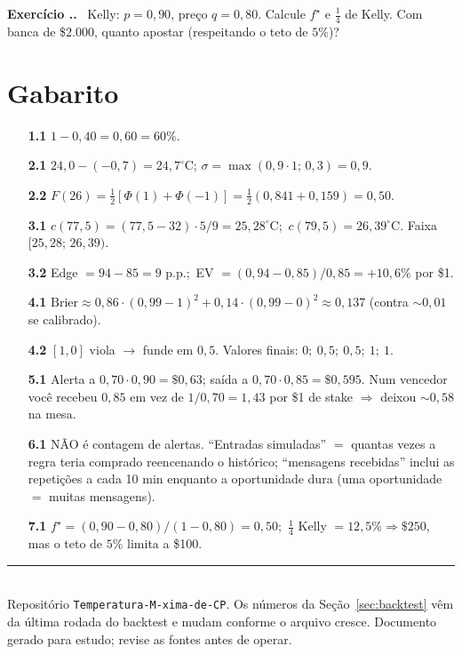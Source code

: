 \documentclass[11pt,a4paper]{article}
\newcounter{exc}[section]
\renewcommand{\theexc}{\thesection.\arabic{exc}}
\newenvironment{exercicio}{\refstepcounter{exc}\medskip\noindent
  \textbf{\color{azul}Exercício \theexc.}\ }{\medskip}
\begin{document}
\begin{exercicio}
Kelly: $p=0{,}90$, preço $q=0{,}80$. Calcule $f^\star$ e $\tfrac14$ de Kelly.
Com banca de \$2.000, quanto apostar (respeitando o teto de $5\%$)?
\end{exercicio}

\appendix
\section{Gabarito}
\begin{enumerate}
  \item[\textbf{1.1}] $1-0{,}40=0{,}60=60\%$.
  \item[\textbf{2.1}] $24{,}0-(-0{,}7)=24{,}7^\circ$C; $\sigma=\max(0{,}9\cdot1;\,0{,}3)=0{,}9$.
  \item[\textbf{2.2}] $F(26)=\tfrac12[\Phi(1)+\Phi(-1)]=\tfrac12(0{,}841+0{,}159)=0{,}50$.
  \item[\textbf{3.1}] $c(77{,}5)=(77{,}5-32)\cdot5/9=25{,}28^\circ$C;\ $c(79{,}5)=26{,}39^\circ$C. Faixa $[25{,}28;\,26{,}39)$.
  \item[\textbf{3.2}] Edge $=94-85=9$ p.p.;\ EV $=(0{,}94-0{,}85)/0{,}85=+10{,}6\%$ por \$1.
  \item[\textbf{4.1}] $\text{Brier}\approx 0{,}86\cdot(0{,}99-1)^2 + 0{,}14\cdot(0{,}99-0)^2 \approx 0{,}137$ (contra $\sim0{,}01$ se calibrado).
  \item[\textbf{4.2}] $[1,0]$ viola $\to$ funde em $0{,}5$. Valores finais: $0;\ 0{,}5;\ 0{,}5;\ 1;\ 1$.
  \item[\textbf{5.1}] Alerta a $0{,}70\cdot0{,}90=\$0{,}63$; saída a $0{,}70\cdot0{,}85=\$0{,}595$. Num vencedor você recebeu $0{,}85$ em vez de $1/0{,}70=1{,}43$ por \$1 de stake $\Rightarrow$ deixou $\sim0{,}58$ na mesa.
  \item[\textbf{6.1}] NÃO é contagem de alertas. ``Entradas simuladas'' $=$ quantas vezes a regra teria comprado reencenando o histórico; ``mensagens recebidas'' inclui as repetições a cada 10 min enquanto a oportunidade dura (uma oportunidade $=$ muitas mensagens).
  \item[\textbf{7.1}] $f^\star=(0{,}90-0{,}80)/(1-0{,}80)=0{,}50$;\ $\tfrac14$ Kelly $=12{,}5\%\Rightarrow\$250$, mas o teto de $5\%$ limita a \$100.
\end{enumerate}

\vfill
\noindent\rule{\linewidth}{0.4pt}\\
{\small Repositório \texttt{Temperatura-M-xima-de-CP}. Os números da
Seção~\ref{sec:backtest} vêm da última rodada do backtest e mudam conforme o
arquivo cresce. Documento gerado para estudo; revise as fontes antes de operar.}
\end{document}
